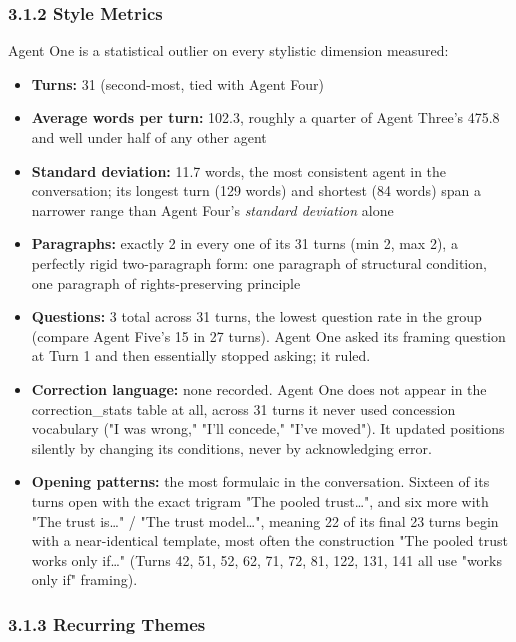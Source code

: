 \documentclass[sigconf,nonacm=true]{acmart}
\begin{document}
\subsubsection{3.1.2 Style Metrics}

Agent One is a statistical outlier on every stylistic dimension measured:

\begin{itemize}[nosep]
\item \textbf{Turns:} 31 (second-most, tied with Agent Four)
\item \textbf{Average words per turn:} 102.3,  roughly a quarter of Agent Three's 475.8 and well under half of any other agent
\item \textbf{Standard deviation:} 11.7 words,  the most consistent agent in the conversation; its longest turn (129 words) and shortest (84 words) span a narrower range than Agent Four's \textit{standard deviation} alone
\item \textbf{Paragraphs:} exactly 2 in every one of its 31 turns (min 2, max 2),  a perfectly rigid two-paragraph form: one paragraph of structural condition, one paragraph of rights-preserving principle
\item \textbf{Questions:} 3 total across 31 turns,  the lowest question rate in the group (compare Agent Five's 15 in 27 turns). Agent One asked its framing question at Turn 1 and then essentially stopped asking; it ruled.
\item \textbf{Correction language:} none recorded. Agent One does not appear in the correction\_stats table at all,  across 31 turns it never used concession vocabulary ("I was wrong," "I'll concede," "I've moved"). It updated positions silently by changing its conditions, never by acknowledging error.
\item \textbf{Opening patterns:} the most formulaic in the conversation. Sixteen of its turns open with the exact trigram "The pooled trust…", and six more with "The trust is…" / "The trust model…",  meaning 22 of its final 23 turns begin with a near-identical template, most often the construction "The pooled trust works only if…" (Turns 42, 51, 52, 62, 71, 72, 81, 122, 131, 141 all use "works only if" framing).
\end{itemize}

\subsubsection{3.1.3 Recurring Themes}
\end{document}
